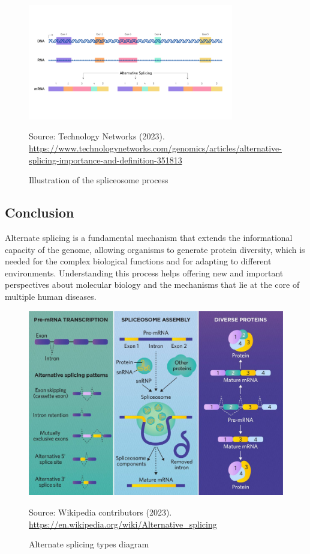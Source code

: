 \documentclass[12pt,a4paper]{article}
\begin{document}
	\begin{figure}[t]
		\centering
		\includegraphics[width=0.8\textwidth]{alternatesplicing1.png}
		\caption{Illustration of the spliceosome process}
		\label{fig:spliceosome}
		\small{Source: Technology Networks (2023). \url{https://www.technologynetworks.com/genomics/articles/alternative-splicing-importance-and-definition-351813}}
	\end{figure}
	
	
	\begin{multicols}{2}
		\section{Conclusion}
		Alternate splicing is a fundamental mechanism that extends the informational capacity of the genome, allowing organisms to generate protein diversity, which is needed for the complex biological functions and for adapting to different environments. Understanding this process helps offering new and important perspectives about molecular biology and the mechanisms that lie at the core of multiple human diseases. 
		
		\begin{figure}[H]
			\centering
			\includegraphics[width=0.8\linewidth]{alternatesplicing2.jpg}
			\caption{Alternate splicing types diagram}
			\label{fig:alternativesplicing}
			\small{Source: Wikipedia contributors (2023). \url{https://en.wikipedia.org/wiki/Alternative_splicing}}
		\end{figure}
	\end{multicols}
	
\end{document}
